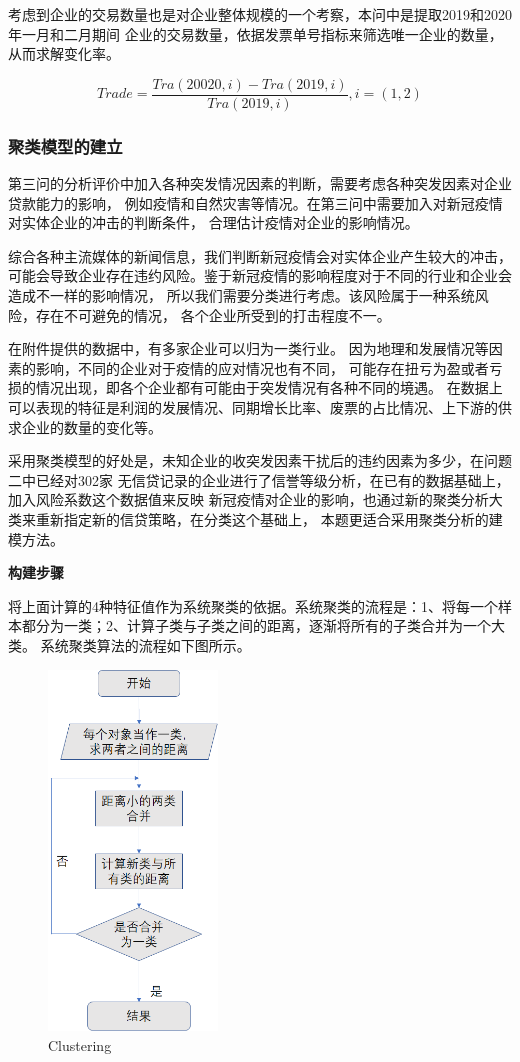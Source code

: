 \documentclass[UTF8]{ctexart}
\begin{document}
考虑到企业的交易数量也是对企业整体规模的一个考察，本问中是提取2019和2020年一月和二月期间
企业的交易数量，依据发票单号指标来筛选唯一企业的数量，从而求解变化率。

\begin{equation}
	Trade = \frac{Tra(20020,i)-Tra(2019,i)}{Tra(2019,i)},i=(1,2)
\end{equation}


\subsubsection{聚类模型的建立}

第三问的分析评价中加入各种突发情况因素的判断，需要考虑各种突发因素对企业贷款能力的影响，
例如疫情和自然灾害等情况。在第三问中需要加入对新冠疫情对实体企业的冲击的判断条件，
合理估计疫情对企业的影响情况。

综合各种主流媒体的新闻信息，我们判断新冠疫情会对实体企业产生较大的冲击，
可能会导致企业存在违约风险。鉴于新冠疫情的影响程度对于不同的行业和企业会造成不一样的影响情况，
所以我们需要分类进行考虑。该风险属于一种系统风险，存在不可避免的情况，
各个企业所受到的打击程度不一。

在附件提供的数据中，有多家企业可以归为一类行业。
因为地理和发展情况等因素的影响，不同的企业对于疫情的应对情况也有不同，
可能存在扭亏为盈或者亏损的情况出现，即各个企业都有可能由于突发情况有各种不同的境遇。
在数据上可以表现的特征是利润的发展情况、同期增长比率、废票的占比情况、上下游的供求企业的数量的变化等。

采用聚类模型的好处是，未知企业的收突发因素干扰后的违约因素为多少，在问题二中已经对302家
无信贷记录的企业进行了信誉等级分析，在已有的数据基础上，加入风险系数这个数据值来反映
新冠疫情对企业的影响，也通过新的聚类分析大类来重新指定新的信贷策略，在分类这个基础上，
本题更适合采用聚类分析的建模方法。

\textbf{构建步骤}

将上面计算的4种特征值作为系统聚类的依据。系统聚类的流程是：1、将每一个样本都分为一类；2、计算子类与子类之间的距离，逐渐将所有的子类合并为一个大类。
系统聚类算法的流程如下图所示。
\begin{figure}[H]\centering
	\includegraphics[width=0.4\textwidth,height=0.72\textwidth]{img/3/Clustering.png} %
	\caption{Clustering}
	\label{fig:figure 2} %
\end{figure}
\end{document}
